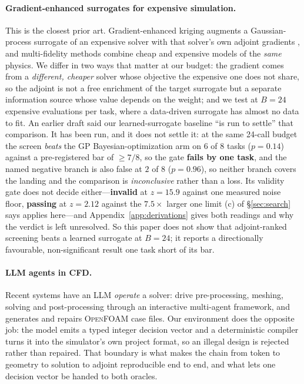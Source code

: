 \documentclass{article}
\begin{document}
\paragraph{Gradient-enhanced surrogates for expensive simulation.}
This is the closest prior art.  Gradient-enhanced kriging augments a Gaussian-process
surrogate of an expensive solver with that solver's own adjoint gradients
\citep{han2017weighted}, and multi-fidelity methods
\citep{peherstorfer2018survey,peherstorfer2016optimal} combine cheap and expensive models
of the \emph{same} physics.  We differ in two ways that matter at our budget: the
gradient comes from a \emph{different, cheaper} solver whose objective the expensive one
does not share, so the adjoint is not a free enrichment of the target surrogate but a
separate information source whose value depends on the weight; and we test at $B = 24$
expensive evaluations per task, where a data-driven surrogate has almost no data to fit.
An earlier draft said our learned-surrogate baseline ``is run to settle'' that
comparison.  It has been run, and it does not settle it: at the same 24-call budget the
screen \emph{beats} the GP Bayesian-optimization arm on $6$ of $8$ tasks ($p = 0.14$)
against a pre-registered bar of $\ge 7/8$, so the gate \textbf{fails by one task}, and the
named negative branch is also false at $2$ of $8$ ($p = 0.96$), so neither branch covers
the landing and the comparison is \emph{inconclusive} rather than a loss.  Its validity
gate does not decide either---\textbf{invalid} at $z = 15.9$ against one measured noise
floor, \textbf{passing} at $z = 2.12$ against the $7.5\times$ larger one limit (c) of
\S\ref{sec:search} says applies here---and Appendix~\ref{app:derivations} gives both
readings and why the verdict is left unresolved.  So this paper does not show that
adjoint-ranked screening beats a learned surrogate at $B = 24$; it reports a directionally
favourable, non-significant result one task short of its bar.

\paragraph{LLM agents in CFD.}
Recent systems have an LLM \emph{operate} a solver: \citet{fan2026chatcfd} drive
pre-processing, meshing, solving and post-processing through an interactive multi-agent
framework, and \citet{pandey2025openfoamgpt} generates and repairs \textsc{OpenFOAM} case
files.  Our environment does the opposite job: the model emits a typed integer decision
vector and a deterministic compiler turns it into the simulator's own project format, so an
illegal design is rejected rather than repaired.  That boundary is what makes the chain from
token to geometry to solution to adjoint reproducible end to end, and what lets one decision
vector be handed to both oracles.
\end{document}
